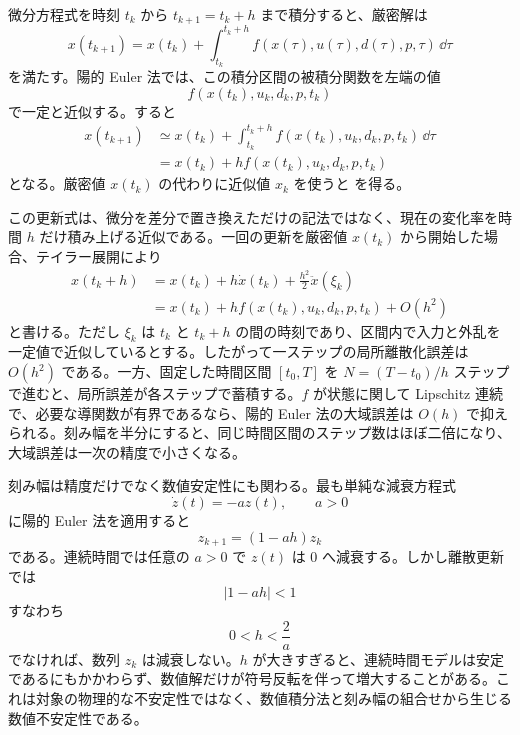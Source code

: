 \begin{derivation}
微分方程式を時刻 $t_k$ から $t_{k+1}=t_k+h$ まで積分すると、厳密解は
\begin{equation}
  x(t_{k+1})=x(t_k)+
  \int_{t_k}^{t_k+h} f(x(\tau),u(\tau),d(\tau),p,\tau)\,\dd\tau
  \label{eq:exact-integral-state-update}
\end{equation}
を満たす。陽的 Euler 法では、この積分区間の被積分関数を左端の値
\begin{equation}
  f(x(t_k),u_k,d_k,p,t_k)
\end{equation}
で一定と近似する。すると
\begin{align}
  x(t_{k+1})
  &\simeq x(t_k)+
  \int_{t_k}^{t_k+h} f(x(t_k),u_k,d_k,p,t_k)\,\dd\tau\\
  &=x(t_k)+h f(x(t_k),u_k,d_k,p,t_k)
\end{align}
となる。厳密値 $x(t_k)$ の代わりに近似値 $x_k$ を使うと  を得る。
\end{derivation}

この更新式は、微分を差分で置き換えただけの記法ではなく、現在の変化率を時間 $h$ だけ積み上げる近似である。一回の更新を厳密値 $x(t_k)$ から開始した場合、テイラー展開により
\begin{align}
  x(t_k+h)
  &=x(t_k)+h\dot{x}(t_k)+\frac{h^2}{2}\ddot{x}(\xi_k)\\
  &=x(t_k)+h f(x(t_k),u_k,d_k,p,t_k)+O(h^2)
\end{align}
と書ける。ただし $\xi_k$ は $t_k$ と $t_k+h$ の間の時刻であり、区間内で入力と外乱を一定値で近似しているとする。したがって一ステップの局所離散化誤差は $O(h^2)$ である。一方、固定した時間区間 $[t_0,T]$ を $N=(T-t_0)/h$ ステップで進むと、局所誤差が各ステップで蓄積する。$f$ が状態に関して Lipschitz 連続で、必要な導関数が有界であるなら、陽的 Euler 法の大域誤差は $O(h)$ で抑えられる。刻み幅を半分にすると、同じ時間区間のステップ数はほぼ二倍になり、大域誤差は一次の精度で小さくなる。

刻み幅は精度だけでなく数値安定性にも関わる。最も単純な減衰方程式
\begin{equation}
  \dot{z}(t)=-a z(t),\qquad a>0
\end{equation}
に陽的 Euler 法を適用すると
\begin{equation}
  z_{k+1}=(1-ah)z_k
  \label{eq:euler-stability-test}
\end{equation}
である。連続時間では任意の $a>0$ で $z(t)$ は 0 へ減衰する。しかし離散更新では
\begin{equation}
  |1-ah|<1
\end{equation}
すなわち
\begin{equation}
  0<h<\frac{2}{a}
  \label{eq:euler-stability-step-bound}
\end{equation}
でなければ、数列 $z_k$ は減衰しない。$h$ が大きすぎると、連続時間モデルは安定であるにもかかわらず、数値解だけが符号反転を伴って増大することがある。これは対象の物理的な不安定性ではなく、数値積分法と刻み幅の組合せから生じる数値不安定性である。

